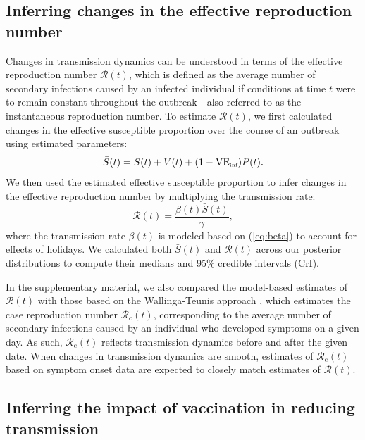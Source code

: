 \documentclass[12pt]{article}
\newcommand{\eref}[1]{(\ref{eq:#1})}
\begin{document}
\subsection{Inferring changes in the effective reproduction number}

Changes in transmission dynamics can be understood in terms of the effective reproduction number $\mathcal{R}(t)$, which is defined as the average number of secondary infections caused by an infected individual if conditions at time $t$ were to remain constant throughout the outbreak---also referred to as the instantaneous reproduction number. 
To estimate $\mathcal{R}(t)$, we first calculated changes in the effective susceptible proportion over the course of an outbreak using estimated parameters: 
\begin{equation}
\bar{S}(t) = S(t) + V(t) + (1-\mathrm{VE}_{\textrm{\tiny{inf}}}) P(t).
\end{equation}
We then used the estimated effective susceptible proportion to infer changes in the effective reproduction number by multiplying the transmission rate:
\begin{equation}
\mathcal R(t) = \frac{\beta(t) \bar{S}(t)}{\gamma},
\end{equation}
where the transmission rate $\beta(t)$ is modeled based on \eref{beta} to account for effects of holidays.
We calculated both $\bar{S}(t)$ and $\mathcal R(t)$ across our posterior distributions to compute their medians and 95\% credible intervals (CrI).

In the supplementary material, we also compared the model-based estimates of $\mathcal R(t)$ with those based on the Wallinga-Teunis approach \citep{wallinga2004different}, which estimates the case reproduction number $\mathcal{R}_{\mathrm c}(t)$, corresponding to the average number of secondary infections caused by an individual who developed symptoms on a given day. As such, $\mathcal{R}_{\mathrm c}(t)$ reflects transmission dynamics before and after the given date.
When changes in transmission dynamics are smooth, estimates of $\mathcal{R}_{\mathrm c}(t)$ based on symptom onset data are expected to closely match estimates of $\mathcal R(t)$.

\subsection{Inferring the impact of vaccination in reducing transmission}
\end{document}
